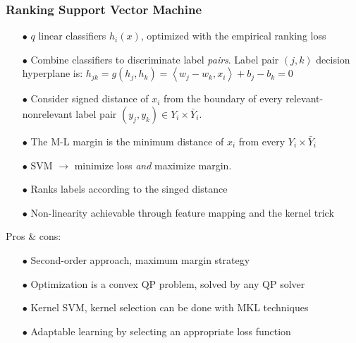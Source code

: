 \documentclass{beamer}
\begin{document}
\begin{frame}
\frametitle{Ranking Support Vector Machine}
\begin{itemize}
	\item[$\bullet$] $q$ linear classifiers $h_i(x)$, optimized with the empirical ranking loss
	\item[$\bullet$] Combine classifiers to discriminate label \emph{pairs}. Label
    pair $(j, k)$ decision hyperplane is: $h_{jk} = g(h_j, h_k) = \left<w_j-w_k, x_i \right> + b_j - b_k=0$
\item[$\bullet$] Consider signed distance of $x_i$ from the boundary of every
  relevant-nonrelevant label pair $(y_j,y_k) \in Y_i \times \bar Y_i$.
\item[$\bullet$] The M-L margin is the minimum distance of $x_i$ from every  $Y_i \times \bar Y_i$
\item[$\bullet$] SVM $\rightarrow$ minimize loss \emph{and} maximize margin.

\item[$\bullet$] Ranks labels according to the singed distance
\item[$\bullet$] Non-linearity achievable through feature mapping and the kernel trick
\end{itemize}
Pros \& cons:
\begin{itemize}
\item[$\bullet$] Second-order approach, maximum margin strategy
\item[$\bullet$] Optimization is a convex QP problem, solved by any QP solver
\item[$\bullet$] Kernel SVM, kernel selection can be done with MKL techniques
\item[$\bullet$] Adaptable learning by selecting an appropriate loss function
\end{itemize}

\end{frame}
\end{document}

